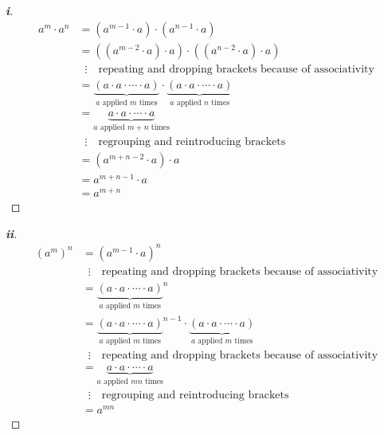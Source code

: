 \documentclass[../main.tex]{subfiles}
\begin{document}
\begin{proof}[\textbf{i}]
  \begin{align*}
    a^{m} \cdot a^{n} &= (a^{m - 1} \cdot a) \cdot (a^{n - 1} \cdot a) \\
                      &= ((a^{m - 2} \cdot a) \cdot a) \cdot ((a^{n - 2} \cdot a) \cdot a) \\
                      &\;\; \vdots \quad\text{repeating and dropping brackets because of associativity} \\
                      &= \underbrace{(a \cdot a \cdot \cdots \cdot a)}_{\text{$a$ applied $m$ times}} \cdot \underbrace{(a \cdot a \cdot \cdots \cdot a)}_{\text{$a$ applied $n$ times}} \\
                      &= \underbrace{a \cdot a \cdot \cdots \cdot a}_{\text{$a$ applied $m + n$ times}} \\
                      &\; \; \vdots \quad\text{regrouping and reintroducing brackets} \\
                      &= (a^{m + n - 2} \cdot a) \cdot a \\
                      &= a^{m + n - 1} \cdot a \\
                      &= a^{m + n}
  \end{align*} 
\end{proof}
\begin{proof}[\textbf{ii}]
  \begin{align*}
    (a^{m})^{n} &= (a^{m - 1} \cdot a)^{n} \\
                &\; \; \vdots \quad\text{repeating and dropping brackets because of associativity}\\
                &= {\underbrace{(a \cdot a \cdot \cdots \cdot a)}_{\text{$a$ applied $m$ times}}}^{n} \\
                &= {\underbrace{(a \cdot a \cdot \cdots \cdot a)}_{\text{$a$ applied $m$ times}}}^{n - 1} \cdot \underbrace{(a \cdot a \cdot \cdots \cdot a)}_{\text{$a$ applied $m$ times}} \\
                &\; \; \vdots \quad\text{repeating and dropping brackets because of associativity}\\
                &= \underbrace{a \cdot a \cdot \cdots \cdot a}_{\text{$a$ applied $mn$ times}} \\
                &\; \; \vdots \quad\text{regrouping and reintroducing brackets} \\
                &= a^{mn}
  \end{align*}
\end{proof}
\end{document}
